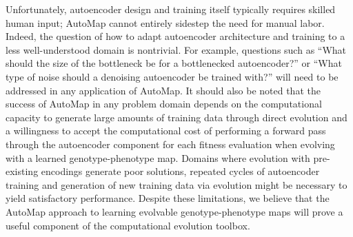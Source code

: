 Unfortunately, autoencoder design and training itself typically requires skilled human input; AutoMap cannot entirely sidestep the need for manual labor.
Indeed, the question of how to adapt autoencoder architecture and training to a less well-understood domain is nontrivial.
For example, questions such as ``What should the size of the bottleneck be for a bottlenecked autoencoder?'' or ``What type of noise should a denoising autoencoder be trained with?'' will need to be addressed in any application of AutoMap.
It should also be noted that the success of AutoMap in any problem domain depends on the computational capacity to generate large amounts of training data through direct evolution and a willingness to accept the computational cost of performing a forward pass through the autoencoder component for each fitness evaluation when evolving with a learned genotype-phenotype map.
Domains where evolution with pre-existing encodings generate poor solutions, repeated cycles of autoencoder training and generation of new training data via evolution might be necessary to yield satisfactory performance.
Despite these limitations, we believe that the AutoMap approach to learning evolvable genotype-phenotype maps will prove a useful component of the computational evolution toolbox.
